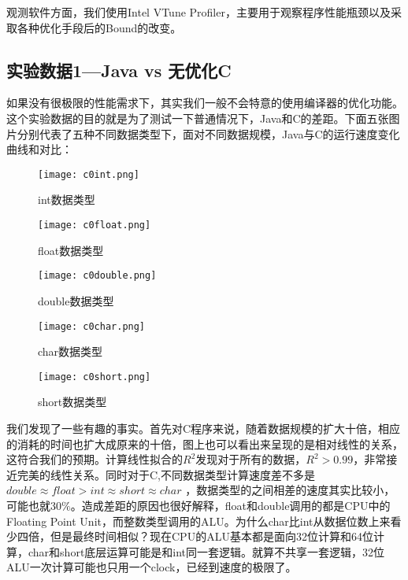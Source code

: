 \documentclass[11pt]{article}
\begin{document}
观测软件方面，我们使用Intel VTune Profiler，主要用于观察程序性能瓶颈以及采取各种优化手段后的Bound的改变。
\subsection{实验数据1—Java vs 无优化C}
如果没有很极限的性能需求下，其实我们一般不会特意的使用编译器的优化功能。这个实验数据的目的就是为了测试一下普通情况下，Java和C的差距。下面五张图片分别代表了五种不同数据类型下，面对不同数据规模，Java与C的运行速度变化曲线和对比：


\begin{figure}[H]
  \centering
  \texttt{[image: c0int.png]}
  \caption{int数据类型}
  \label{fig:example}
\end{figure}

\begin{figure}[H]
  \centering
  \texttt{[image: c0float.png]}
  \caption{float数据类型}
  \label{fig:example}
\end{figure}

\begin{figure}[H]
  \centering
 \texttt{[image: c0double.png]}
  \caption{double数据类型}
  \label{fig:example}
\end{figure}

\begin{figure}[H]
  \centering
  \texttt{[image: c0char.png]}
  \caption{char数据类型}
  \label{fig:example}
\end{figure}


\begin{figure}[H]
  \centering
  \texttt{[image: c0short.png]}
  \caption{short数据类型}
  \label{fig:example}
\end{figure}


我们发现了一些有趣的事实。首先对C程序来说，随着数据规模的扩大十倍，相应的消耗的时间也扩大成原来的十倍，图上也可以看出来呈现的是相对线性的关系，这符合我们的预期。计算线性拟合的$R^2$发现对于所有的数据，$R^2>0.99$，非常接近完美的线性关系。同时对于C,不同数据类型计算速度差不多是$double\approx  float > int\approx short \approx char$ ，数据类型的之间相差的速度其实比较小，可能也就30$\%$。造成差距的原因也很好解释，float和double调用的都是CPU中的Floating Point Unit，而整数类型调用的ALU。为什么char比int从数据位数上来看少四倍，但是最终时间相似？现在CPU的ALU基本都是面向32位计算和64位计算，char和short底层运算可能是和int同一套逻辑。就算不共享一套逻辑，32位ALU一次计算可能也只用一个clock，已经到速度的极限了。
\end{document}
